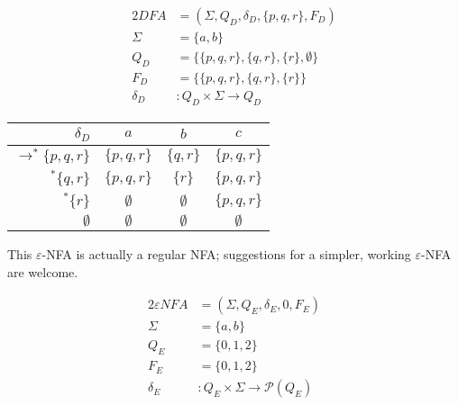 \documentclass[docid=TP04]{tcom_TP}
\begin{document}
{\begin{center}
\end{center}
\begin{center}
\begin{minipage}[c]{0.35\textwidth}
\begin{alignat*}{2}
	DFA       &= (\Sigma, Q_D, \delta_D, \{p,q,r\}, F_D)\\
	\Sigma    &= \{a,b\}\\
	Q_D       &= \{\{p,q,r\},\{q,r\},\{r\},\emptyset\}\\
	F_D       &= \{\{p,q,r\},\{q,r\},\{r\}\}\\
	\delta_D &\colon Q_D \times \Sigma \rightarrow Q_D
\end{alignat*}
\end{minipage}%
\begin{minipage}[c]{0.45\textwidth}
\begin{center}
\begin{tabular}{ r | c c c }
    $\delta_D$ & $a$ & $b$ & $c$ \\ \hline
    $\rightarrow^* \{p,q,r\}$ & $\{p,q,r\}$ & $\{  q,r\}$ & $\{p,q,r\}$ \\
    $           ^* \{  q,r\}$ & $\{p,q,r\}$ & $\{    r\}$ & $\{p,q,r\}$ \\
    $           ^* \{    r\}$ & $\emptyset$ & $\emptyset$ & $\{p,q,r\}$\\
    $ \emptyset                $ & $\emptyset$ & $\emptyset$ & $\emptyset$
\end{tabular}
\end{center}
\end{minipage}
\end{center}
This $\varepsilon$-NFA is actually a regular NFA; suggestions for a simpler, working $\varepsilon$-NFA are welcome.
\begin{center}
	\begin{minipage}[c]{0.35\textwidth}
		\begin{alignat*}{2}
			\varepsilon NFA &= (\Sigma, Q_E, \delta_E, 0, F_E)\\
			\Sigma &= \{a,b\}\\
			Q_E    &= \{0,1,2\}\\
			F_E    &= \{0,1,2\}\\
			\delta_E &\colon Q_E \times \Sigma \rightarrow \mathscr{P}(Q_E)
		\end{alignat*}
	\end{minipage}
	\begin{minipage}[c]{0.35\textwidth}

\end{minipage}
\end{center}}
\end{document}
